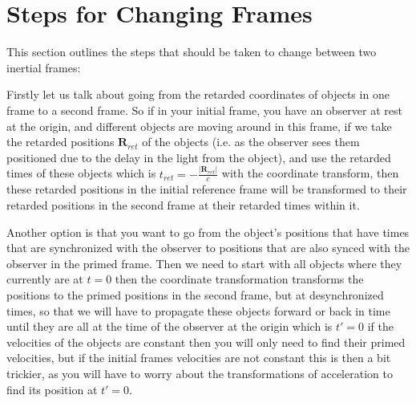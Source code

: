 

\section{Steps for Changing Frames}

This section outlines the steps that should be taken to change between two inertial frames: \newline

Firstly let us talk about going from the retarded coordinates of objects in one frame to a second frame. So if in your initial frame, you have an observer at rest at the origin, and different objects are moving around in this frame, if we take the retarded positions $\mathbf{R}_{ret}$ of the objects (i.e. as the observer sees them positioned due to the delay in the light from the object), and use the retarded times of these objects which is ${t}_{ret}=- \frac{|\mathbf{R}_{ret}|}{c}$ with the coordinate transform, then these retarded positions in the initial reference frame will be transformed to their retarded positions in the second frame at their retarded times within it. \newline

Another option is that you want to go from the object's positions that have times that are synchronized with the observer to positions that are also synced with the observer in the primed frame. Then we need to start with all objects where they currently are at $t=0$ then the coordinate transformation transforms the positions to the primed positions in the second frame, but at desynchronized times, so that we will have to propagate these objects forward or back in time until they are all at the time of the observer at the origin which is $t{'}=0$ if the velocities of the objects are constant then you will only need to find their primed velocities, but if the initial frames velocities are not constant this is then a bit trickier, as you will have to worry about the transformations of acceleration to find its position at $t{'}=0$.

